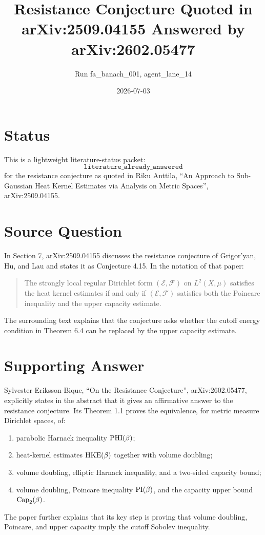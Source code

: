 \documentclass[11pt]{article}
\title{Resistance Conjecture Quoted in arXiv:2509.04155 Answered by arXiv:2602.05477}
\author{Run fa\_banach\_001, agent\_lane\_14}
\date{2026-07-03}
\begin{document}
\maketitle

\section*{Status}

This is a lightweight literature-status packet:
\[
\texttt{literature\_already\_answered}
\]
for the resistance conjecture as quoted in Riku Anttila, ``An Approach to
Sub-Gaussian Heat Kernel Estimates via Analysis on Metric Spaces'',
arXiv:2509.04155.

\section*{Source Question}

In Section 7, arXiv:2509.04155 discusses the resistance conjecture of
Grigor'yan, Hu, and Lau and states it as Conjecture 4.15. In the notation of
that paper:

\begin{quote}
The strongly local regular Dirichlet form
\((\mathcal E,\mathcal F)\) on \(L^2(X,\mu)\) satisfies the heat kernel
estimates if and only if \((\mathcal E,\mathcal F)\) satisfies both the
Poincare inequality and the upper capacity estimate.
\end{quote}

The surrounding text explains that the conjecture asks whether the cutoff
energy condition in Theorem 6.4 can be replaced by the upper capacity estimate.

\section*{Supporting Answer}

Sylvester Eriksson-Bique, ``On the Resistance Conjecture'',
arXiv:2602.05477, explicitly states in the abstract that it gives an
affirmative answer to the resistance conjecture. Its Theorem 1.1 proves the
equivalence, for metric measure Dirichlet spaces, of:
\begin{enumerate}
\item parabolic Harnack inequality \({\rm PHI}(\beta)\);
\item heat-kernel estimates \({\rm HKE}(\beta)\) together with volume doubling;
\item volume doubling, elliptic Harnack inequality, and a two-sided capacity
bound;
\item volume doubling, Poincare inequality \({\rm PI}(\beta)\), and the
capacity upper bound \({\rm Cap}_2(\beta)\).
\end{enumerate}
The paper further explains that its key step is proving that volume doubling,
Poincare, and upper capacity imply the cutoff Sobolev inequality.
\end{document}
